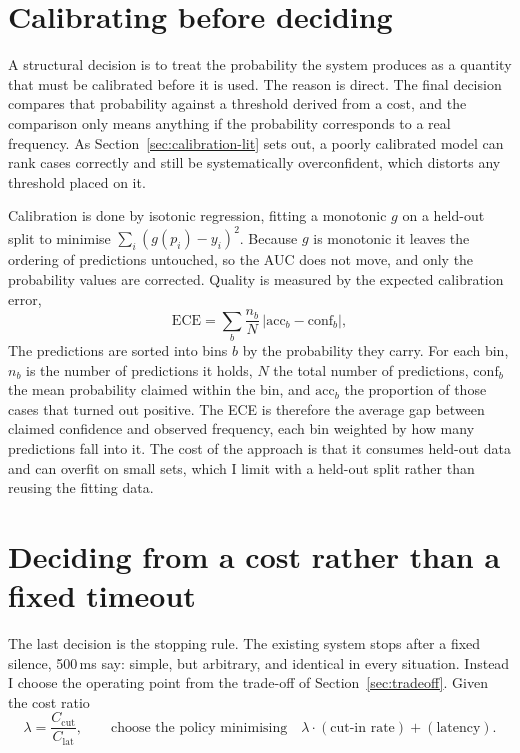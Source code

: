 \section{Calibrating before deciding}
\label{sec:calibdesign}

A structural decision is to treat the probability the system produces as a quantity that
must be calibrated before it is used. The reason is direct. The final decision compares
that probability against a threshold derived from a cost, and the comparison only means
anything if the probability corresponds to a real frequency. As Section~\ref{sec:calibration-lit}
sets out, a poorly calibrated model can rank cases correctly and still be systematically
overconfident, which distorts any threshold placed on it.

Calibration is done by isotonic regression, fitting a monotonic $g$ on a held-out split to
minimise $\sum_i (g(p_i) - y_i)^2$. Because $g$ is monotonic it leaves the ordering of
predictions untouched, so the AUC does not move, and only the probability values are corrected. Quality is measured by the expected calibration error,
\begin{equation}
\mathrm{ECE} = \sum_{b} \frac{n_b}{N} \, \bigl| \mathrm{acc}_b - \mathrm{conf}_b \bigr| ,
\label{eq:ece}
\end{equation}
The predictions are sorted into bins $b$ by the probability they carry. For each bin,
$n_b$ is the number of predictions it holds, $N$ the total number of predictions,
$\mathrm{conf}_b$ the mean probability claimed within the bin, and $\mathrm{acc}_b$ the
proportion of those cases that turned out positive. The ECE is therefore the average gap
between claimed confidence and observed frequency, each bin weighted by how many predictions
fall into it. The cost of the approach is that it consumes held-out data and can
overfit on small sets, which I limit with a held-out split rather than reusing the fitting
data.

\section{Deciding from a cost rather than a fixed timeout}
\label{sec:costdesign}

The last decision is the stopping rule. The existing system stops after a fixed silence,
500\,ms say: simple, but arbitrary, and identical in every situation. Instead I choose the
operating point from the trade-off of Section~\ref{sec:tradeoff}. Given the cost ratio
\begin{equation}
\lambda = \frac{C_{\mathrm{cut}}}{C_{\mathrm{lat}}} ,
\qquad
\text{choose the policy minimising}
\quad
\lambda \cdot (\text{cut-in rate}) + (\text{latency}) .
\label{eq:cost}
\end{equation}


